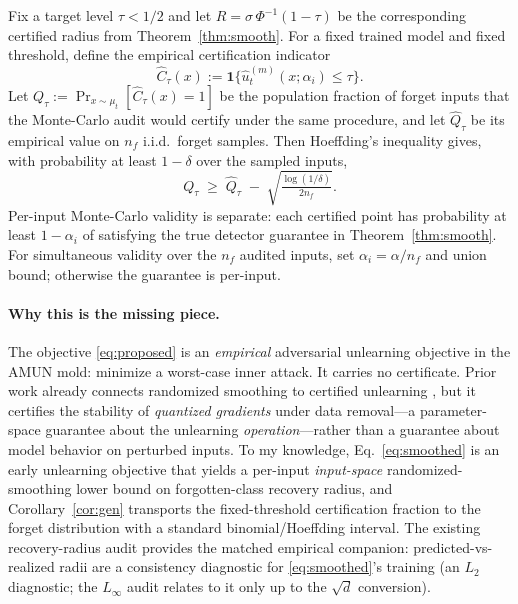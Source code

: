 \begin{corollary}
\label{cor:gen}
Fix a target level $\tau < 1/2$ and let $R = \sigma\,\Phi^{-1}(1-\tau)$ be
the corresponding certified radius from Theorem~\ref{thm:smooth}. For a fixed
trained model and fixed threshold, define the empirical certification indicator
\[
  \widehat C_\tau(x) := \mathbf{1}\{\widehat u_t^{(m)}(x;\alpha_i)\leq\tau\}.
\]
Let $Q_\tau := \Pr_{x \sim \mu_t}[\widehat C_\tau(x)=1]$ be the population
fraction of forget inputs that the Monte-Carlo audit would certify under the
same procedure, and let $\widehat Q_\tau$ be its empirical value on $n_f$
i.i.d.\ forget samples. Then Hoeffding's inequality gives, with probability at
least $1-\delta$ over the sampled inputs,
\[
Q_\tau \;\geq\; \widehat Q_\tau
\;-\; \sqrt{\tfrac{\log(1/\delta)}{2 n_f}}.
\]
Per-input Monte-Carlo validity is separate: each certified point has
probability at least $1-\alpha_i$ of satisfying the true detector guarantee in
Theorem~\ref{thm:smooth}. For simultaneous validity over the $n_f$ audited
inputs, set $\alpha_i=\alpha/n_f$ and union bound; otherwise the guarantee is
per-input.
\end{corollary}

\paragraph{Why this is the missing piece.} The objective
\eqref{eq:proposed} is an
\emph{empirical} adversarial unlearning objective in the AMUN
\cite{krishna2025amun} mold: minimize a worst-case inner attack. It carries
no certificate. Prior work already connects randomized smoothing to
certified unlearning \cite{zhang2022pcmu}, but it certifies the stability of
\emph{quantized gradients} under data removal---a parameter-space guarantee
about the unlearning \emph{operation}---rather than a guarantee about model
behavior on perturbed inputs. To my knowledge, Eq.~\eqref{eq:smoothed} is an
early unlearning objective that yields a per-input \emph{input-space}
randomized-smoothing lower bound on forgotten-class recovery radius, and
Corollary~\ref{cor:gen} transports the fixed-threshold certification fraction
to the forget distribution with a standard binomial/Hoeffding interval. The
existing recovery-radius audit provides the matched empirical companion:
predicted-vs-realized radii are a consistency diagnostic for
\eqref{eq:smoothed}'s training (an $L_2$ diagnostic; the $L_\infty$ audit
relates to it only up to the $\sqrt{d}$ conversion).

